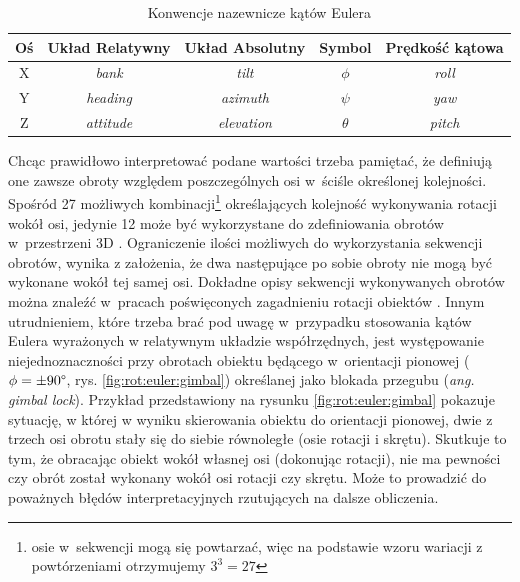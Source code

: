 																											
																											
\begin{table}[!htb]
	\centering
	\caption{Konwencje nazewnicze kątów Eulera}
	\label{tab:appx:rot:eulerNames} 
	\begin{tabular}{|c|c|c|c|c|}
		\hline
		Oś & Układ Relatywny & Układ Absolutny & Symbol   & Prędkość kątowa \\
		\hline
		X   & \emph{bank}      & \emph{tilt}      & $\phi$   & \emph{roll}         \\
		Y   & \emph{heading}   & \emph{azimuth}   & $\psi$   & \emph{yaw}          \\ 
		Z   & \emph{attitude}  & \emph{elevation} & $\theta$ & \emph{pitch}        \\
		\hline
	\end{tabular} 
\end{table}
																													
Chcąc prawidłowo interpretować podane wartości trzeba pamiętać, że definiują one zawsze obroty względem poszczególnych osi w~ściśle określonej kolejności. Spośród 27 możliwych kombinacji\footnote{osie w~sekwencji mogą się powtarzać, więc na podstawie wzoru wariacji z powtórzeniami otrzymujemy $3^3 = 27$} określających kolejność wykonywania rotacji wokół osi, jedynie 12 może być wykorzystane do zdefiniowania obrotów w~przestrzeni 3D \cite{Diebel2006}. Ograniczenie ilości możliwych do wykorzystania sekwencji obrotów, wynika z założenia, że dwa następujące po sobie obroty nie mogą być wykonane wokół tej samej osi. Dokładne opisy sekwencji wykonywanych obrotów można znaleźć w~pracach poświęconych zagadnieniu rotacji obiektów \cite{Pio1966, Diebel2006}. Innym utrudnieniem, które trzeba brać pod uwagę w~przypadku stosowania kątów Eulera wyrażonych w relatywnym układzie współrzędnych, jest występowanie niejednoznaczności przy obrotach obiektu będącego w~orientacji pionowej ($\phi=\pm90\degree$, rys. \ref{fig:rot:euler:gimbal}) określanej jako blokada przegubu (\emph{ang. gimbal lock}). Przykład przedstawiony na rysunku \ref{fig:rot:euler:gimbal} pokazuje sytuację, w której w wyniku skierowania obiektu do orientacji pionowej, dwie z trzech osi obrotu stały się do siebie równoległe (osie rotacji i skrętu). Skutkuje to tym, że obracając obiekt wokół własnej osi (dokonując rotacji), nie ma pewności czy obrót został wykonany wokół osi rotacji czy skrętu. Może to prowadzić do poważnych błędów interpretacyjnych rzutujących na dalsze obliczenia.

